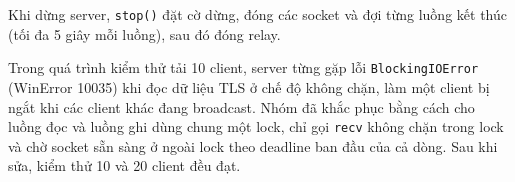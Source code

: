Khi dừng server, \texttt{stop()} đặt cờ dừng, đóng các socket và đợi từng luồng kết thúc (tối đa 5 giây mỗi luồng), sau đó đóng relay.

Trong quá trình kiểm thử tải 10 client, server từng gặp lỗi \texttt{BlockingIOError} (WinError 10035) khi đọc dữ liệu TLS ở chế độ không chặn, làm một client bị ngắt khi các client khác đang broadcast. Nhóm đã khắc phục bằng cách cho luồng đọc và luồng ghi dùng chung một lock, chỉ gọi \texttt{recv} không chặn trong lock và chờ socket sẵn sàng ở ngoài lock theo deadline ban đầu của cả dòng. Sau khi sửa, kiểm thử 10 và 20 client đều đạt.
